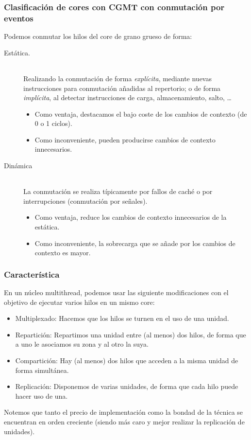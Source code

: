 \subsubsection{Clasificación de cores con CGMT con conmutación por eventos}
Podemos conmutar los hilos del core de grano grueso de forma:
\begin{description}
    \item [Estática.]~\\ 
        Realizando la conmutación de forma \emph{explícita}, mediante nuevas instrucciones para conmutación añadidas al repertorio; o de forma \emph{implícita}, al detectar instrucciones de carga, almacenamiento, salto, \ldots

        \begin{itemize}
            \item Como ventaja, destacamos el bajo coste de los cambios de contexto (de 0 o 1 ciclos).
            \item Como inconveniente, pueden producirse cambios de contexto innecesarios.
        \end{itemize}
    \item [Dinámica]~\\
        La conmutación se realiza típicamente por fallos de caché o por interrupciones (conmutación por señales).

        \begin{itemize}
            \item Como ventaja, reduce los cambios de contexto innecesarios de la estática.
            \item Como inconveniente, la sobrecarga que se añade por los cambios de contexto es mayor.
        \end{itemize}
\end{description}

\subsubsection{Característica}
En un núcleo multithread, podemos usar las siguiente modificaciones con el objetivo de ejecutar varios hilos en un mismo core:
\begin{itemize}
    \item Multiplexado: Hacemos que los hilos se turnen en el uso de una unidad.
    \item Repartición: Repartimos una unidad entre (al menos) dos hilos, de forma que a uno le asociamos su zona y al otro la suya.
    \item Compartición: Hay (al menos) dos hilos que acceden a la misma unidad de forma simultánea.
    \item Replicación: Disponemos de varias unidades, de forma que cada hilo puede hacer uso de una.
\end{itemize}
Notemos que tanto el precio de implementación como la bondad de la técnica se encuentran en orden creciente (siendo más caro y mejor realizar la replicación de unidades).\\

